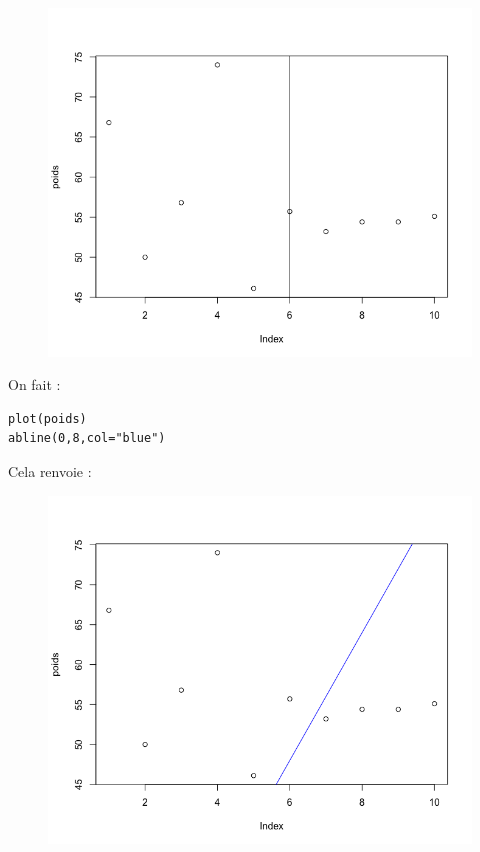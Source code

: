 \begin{figure}[H]\begin{center}\includegraphics[scale=0.4]{ilu/gra59.png}\end{center}\end{figure}
On fait :
\begin{lstlisting}[language=html]
plot(poids)
abline(0,8,col="blue")
\end{lstlisting}
Cela renvoie :
\begin{figure}[H]\begin{center}\includegraphics[scale=0.4]{ilu/gra60.png}\end{center}\end{figure}
